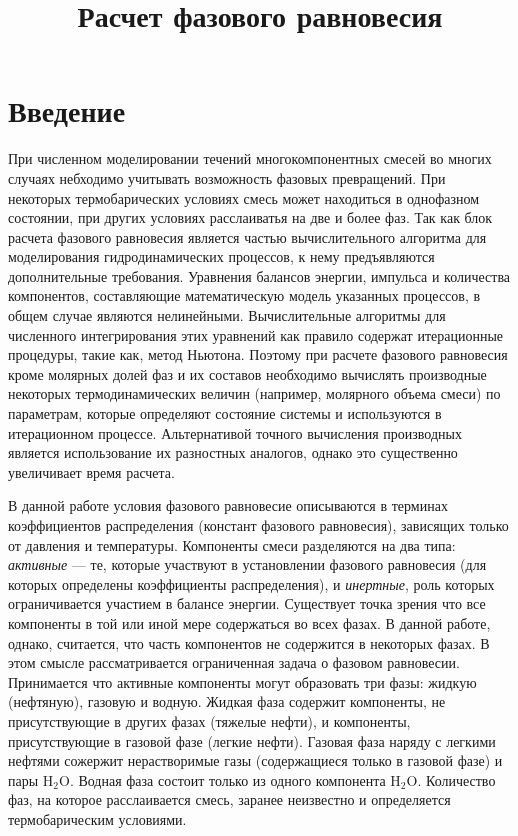 ﻿\documentclass[12pt]{article}
\title{Расчет фазового равновесия}
\begin{document}
\maketitle

\section{Введение}

При численном моделировании течений многокомпонентных смесей во многих случаях небходимо учитывать возможность фазовых
превращений. При некоторых термобарических условиях смесь может находиться в однофазном состоянии, при других условиях
расслаиватья на две и более фаз. Так как блок расчета фазового равновесия является частью вычислительного алгоритма для
моделирования гидродинамических процессов, к нему предъявляются дополнительные требования. Уравнения балансов энергии,
импульса и количества компонентов, составляющие математическую модель указанных процессов, в общем случае являются
нелинейными. Вычислительные алгоритмы для численного интегрирования этих уравнений как правило содержат итерационные
процедуры, такие как, метод Ньютона. Поэтому при расчете фазового равновесия кроме молярных долей фаз и их составов
необходимо вычислять производные некоторых термодинамических величин (например, молярного объема смеси) по параметрам,
которые определяют состояние системы и используются в итерационном процессе. Альтернативой точного вычисления
производных является использование их разностных аналогов, однако это существенно увеличивает время расчета.

В данной работе условия фазового равновесие описываются в терминах коэффициентов распределения (констант фазового
равновесия), зависящих только от давления и температуры. Компоненты смеси разделяются на два типа: \emph{активные} ---
те, которые участвуют в установлении фазового равновесия (для которых определены коэффициенты распределения), и
\emph{инертные}, роль которых ограничивается участием в балансе энергии. Существует точка зрения что все компоненты в
той или иной мере содержаться во всех фазах. В данной работе, однако, считается, что часть компонентов не содержится в
некоторых фазах. В этом смысле рассматривается ограниченная задача о фазовом равновесии. Принимается что активные
компоненты могут образовать три фазы: жидкую (нефтяную), газовую и водную.  Жидкая фаза содержит компоненты, не
присутствующие в других фазах (тяжелые нефти), и компоненты, присутствующие в газовой фазе (легкие нефти). Газовая фаза
наряду с легкими нефтями сожержит нерастворимые газы (содержащиеся только в газовой фазе) и пары $\mathrm{H_2O}$.
Водная фаза состоит только из одного компонента $\mathrm{H_2O}$. Количество фаз, на которое расслаивается смесь,
заранее неизвестно и определяется термобарическим условиями.
\end{document}

